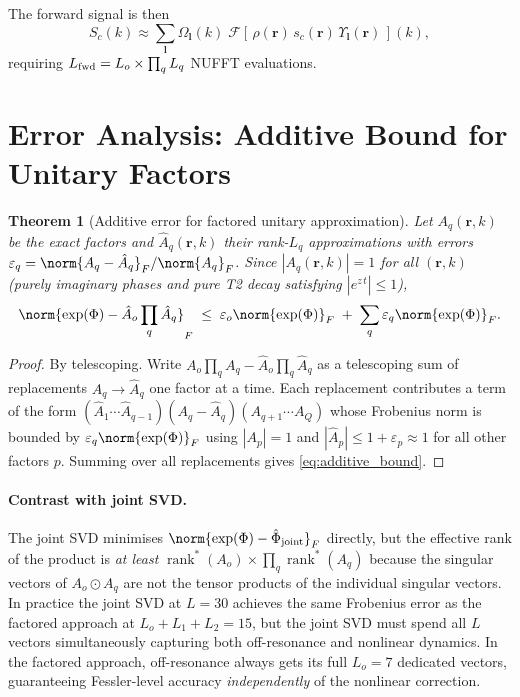 \documentclass{article}
\newtheorem{theorem}{Theorem}
\begin{document}
The forward signal is then
\begin{equation}
    S_c(k) \approx \sum_{\boldsymbol{l}}
    \Omega_{\boldsymbol{l}}(k)\;
    \mathcal{F}\!\left[\,\rho(\mathbf{r})\,s_c(\mathbf{r})\,\Upsilon_{\boldsymbol{l}}(\mathbf{r})\,\right]\!(k),
    \label{eq:forward_factored}
\end{equation}
requiring $L_{\rm fwd} = L_o \times \prod_q L_q$ NUFFT evaluations.

\section{Error Analysis: Additive Bound for Unitary Factors}

\begin{theorem}[Additive error for factored unitary approximation]
Let $A_q(\mathbf{r},k)$ be the exact factors and $\hat{A}_q(\mathbf{r},k)$ their
rank-$L_q$ approximations with errors
$\varepsilon_q = \norm{A_q - \hat{A}_q}_F / \norm{A_q}_F$.
Since $|A_q(\mathbf{r},k)| = 1$ for all $(\mathbf{r},k)$
(purely imaginary phases and pure T2 decay satisfying $|e^{z\,t}|\leq 1$),
\begin{equation}
    \norm{\exp(\Phi) - \hat{A}_o \prod_q \hat{A}_q}_F
    \;\leq\;
    \varepsilon_o \norm{\exp(\Phi)}_F \;+\; \sum_q \varepsilon_q \norm{\exp(\Phi)}_F.
    \label{eq:additive_bound}
\end{equation}
\end{theorem}

\begin{proof}
By telescoping.  Write
$A_o \prod_q A_q - \hat{A}_o \prod_q \hat{A}_q$
as a telescoping sum of replacements $A_q \to \hat{A}_q$ one factor at a time.
Each replacement contributes a term of the form
$(\hat{A}_1 \cdots \hat{A}_{q-1})(A_q - \hat{A}_q)(A_{q+1} \cdots A_Q)$
whose Frobenius norm is bounded by $\varepsilon_q \norm{\exp(\Phi)}_F$
using $|A_p| = 1$ and $|\hat{A}_p| \leq 1 + \varepsilon_p \approx 1$ for all other factors $p$.
Summing over all replacements gives \eqref{eq:additive_bound}.
\end{proof}

\paragraph{Contrast with joint SVD.}
The joint SVD minimises $\norm{\exp(\Phi) - \hat{\Phi}_{\rm joint}}_F$ directly, but
the effective rank of the product is \emph{at least} $\operatorname{rank}^*(A_o) \times \prod_q \operatorname{rank}^*(A_q)$
because the singular vectors of $A_o \odot A_q$ are not the tensor products of the
individual singular vectors.  In practice the joint SVD at $L=30$ achieves the same
Frobenius error as the factored approach at $L_o + L_1 + L_2 = 15$, but the joint
SVD must spend all $L$ vectors simultaneously capturing both off-resonance and
nonlinear dynamics.  In the factored approach, off-resonance always gets its full
$L_o = 7$ dedicated vectors, guaranteeing Fessler-level accuracy \emph{independently}
of the nonlinear correction.
\end{document}
